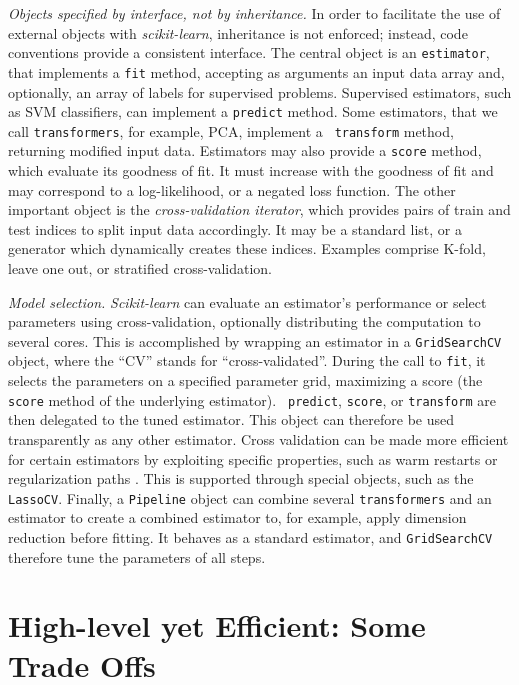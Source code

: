 \documentclass[twoside,11pt]{article}
\begin{document}
\noindent\emph{Objects specified by interface, not by inheritance.}
%
In order to facilitate the use of external objects with \emph{scikit-learn},
inheritance is not enforced; instead, code
conventions provide a consistent interface.
The central object is an {\tt estimator}, that implements a
{\tt fit} method, accepting as arguments an input data array and,
optionally, an array of labels for supervised problems. Supervised estimators,
such as SVM classifiers, can implement a {\tt predict} method. Some estimators,
that we call {\tt transformers}, for example, PCA, implement a {\tt
transform} method, returning modified input data.
%
Estimators may also provide a {\tt score} method, which evaluate its
goodness of fit. It must increase with the goodness of fit and
may correspond to a log-likelihood, or a negated loss function.
%
The other important object is the \emph{cross-validation iterator},
which provides pairs of train and test indices to split input
data accordingly. It may be a standard list, or a generator
which dynamically
creates these indices.
Examples comprise K-fold,
leave one out, or
stratified cross-validation.


\noindent\emph{Model selection.}
%
\noindent\emph{Scikit-learn} can evaluate an estimator's performance or select
parameters using cross-validation, optionally distributing the
computation to several cores.
This is accomplished by wrapping an estimator in a {\tt GridSearchCV}
object, where the ``CV'' stands for ``cross-validated''.
During the call to {\tt fit}, it selects the parameters
on a specified parameter grid, maximizing a score 
(the {\tt score} method of the underlying estimator). {\tt
predict}, {\tt score}, or {\tt transform} are then delegated to the tuned
estimator. This object can therefore be used transparently as any other
estimator.
Cross validation can be made more efficient for certain
estimators by exploiting specific properties, such as warm restarts
or regularization paths \citep{friedman2010}. This is supported through special
objects, such as the {\tt LassoCV}.
%
Finally, a {\tt Pipeline} object can
combine several {\tt transformers} and an estimator to create a
combined estimator to, for example, apply dimension reduction before
fitting. It behaves as a standard estimator, and 
{\tt GridSearchCV} therefore tune the parameters of all steps.

\section{High-level yet Efficient: Some Trade Offs}
\end{document}
